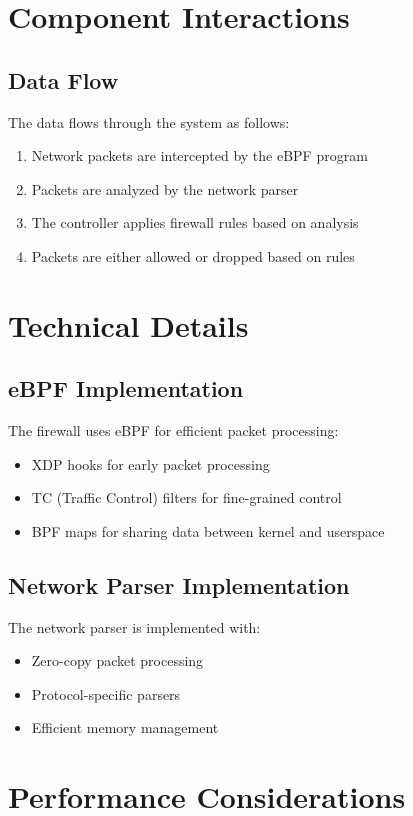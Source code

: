 \documentclass{article}
\begin{document}
\section{Component Interactions}
\subsection{Data Flow}
The data flows through the system as follows:
\begin{enumerate}
    \item Network packets are intercepted by the eBPF program
    \item Packets are analyzed by the network parser
    \item The controller applies firewall rules based on analysis
    \item Packets are either allowed or dropped based on rules
\end{enumerate}

\section{Technical Details}
\subsection{eBPF Implementation}
The firewall uses eBPF for efficient packet processing:
\begin{itemize}
    \item XDP hooks for early packet processing
    \item TC (Traffic Control) filters for fine-grained control
    \item BPF maps for sharing data between kernel and userspace
\end{itemize}

\subsection{Network Parser Implementation}
The network parser is implemented with:
\begin{itemize}
    \item Zero-copy packet processing
    \item Protocol-specific parsers
    \item Efficient memory management
\end{itemize}

\section{Performance Considerations}
\end{document}
